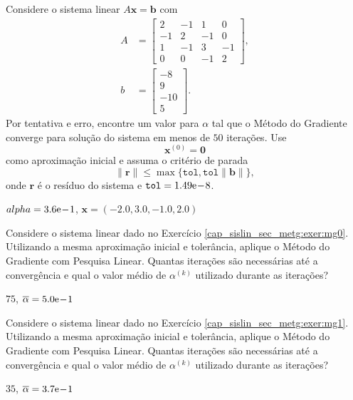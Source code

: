 \begin{exer}\label{cap_sislin_sec_metg:exer:mg1}
  Considere o sistema linear $A\pmb{x} = \pmb{b}$ com
  \begin{align}
    A &=
    \begin{bmatrix}
      2 & -1 & 1 & 0\\
      -1 & 2 & -1 & 0\\
      1 & -1 & 3 & -1 \\
      0 & 0 & -1 & 2
    \end{bmatrix},\\
    b &=
    \begin{bmatrix}
      -8\\
      9\\
      -10\\
      5
    \end{bmatrix}.
  \end{align}
  Por tentativa e erro, encontre um valor para $\alpha$ tal que o Método do Gradiente converge para solução do sistema em menos de $50$ iterações. Use
  \begin{equation}
    \pmb{x}^{(0)} = \pmb{0}
  \end{equation}
  como aproximação inicial e assuma o critério de parada
  \begin{equation}
    \|\pmb{r}\| \leq \max\{\texttt{tol}, \texttt{tol}\|\pmb{b}\|\},
  \end{equation}
  onde $\pmb{r}$ é o resíduo do sistema e $\texttt{tol} = 1.49\mathrm{e}\!-\!8$.
\end{exer}
\begin{resp}
  $alpha = 3.6\mathrm{e}\!-\!1$, $\pmb{x} = \left(-2.0, 3.0, -1.0, 2.0\right)$
\end{resp}


\begin{exer}
  Considere o sistema linear dado no Exercício \ref{cap_sislin_sec_metg:exer:mg0}. Utilizando a mesma aproximação inicial e tolerância, aplique o Método do Gradiente com Pesquisa Linear. Quantas iterações são necessárias até a convergência e qual o valor médio de $\alpha^{(k)}$ utilizado durante as iterações?
\end{exer}
\begin{resp}
  $75$, $\overline{\alpha} = 5.0\mathrm{e}\!-\!1$
\end{resp}

\begin{exer}
  Considere o sistema linear dado no Exercício \ref{cap_sislin_sec_metg:exer:mg1}. Utilizando a mesma aproximação inicial e tolerância, aplique o Método do Gradiente com Pesquisa Linear. Quantas iterações são necessárias até a convergência e qual o valor médio de $\alpha^{(k)}$ utilizado durante as iterações?
\end{exer}
\begin{resp}
  $35$, $\overline{\alpha} = 3.7\mathrm{e}\!-\!1$
\end{resp}


